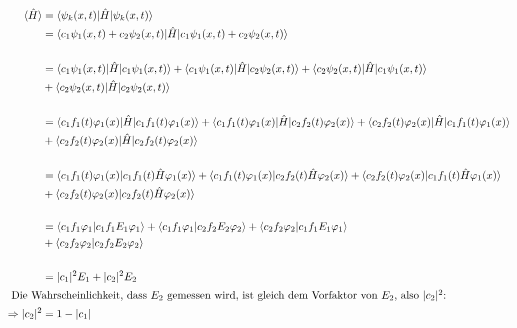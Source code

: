     \begin{align*}
        \langle \hat{H} \rangle &= \langle \psi_k(x, t) \vert \hat{H} \vert \psi_k(x, t) \rangle\\
        &= \langle c_1 \psi_1(x, t) + c_2 \psi_2(x, t) \vert \hat{H} \vert c_1 \psi_1(x, t) + c_2 \psi_2(x, t) \rangle\\
        \\
        &= \langle c_1 \psi_1(x, t) \vert \hat{H} \vert c_1 \psi_1(x, t) \rangle 
        + \langle c_1 \psi_1(x, t) \vert \hat{H} \vert c_2 \psi_2(x, t) \rangle
        + \langle c_2 \psi_2(x, t) \vert \hat{H} \vert c_1 \psi_1(x, t) \rangle\\
        &+ \langle c_2 \psi_2(x, t) \vert \hat{H} \vert c_2 \psi_2(x, t) \rangle\\
        \\
        &= \langle c_1 f_1(t) \varphi_1(x) \vert \hat{H} \vert c_1 f_1(t) \varphi_1(x) \rangle 
        + \langle c_1 f_1(t) \varphi_1(x) \vert \hat{H} \vert c_2 f_2(t) \varphi_2(x) \rangle
        + \langle c_2 f_2(t) \varphi_2(x) \vert \hat{H} \vert c_1 f_1(t) \varphi_1(x) \rangle\\
        &+ \langle c_2 f_2(t) \varphi_2(x) \vert \hat{H} \vert c_2 f_2(t) \varphi_2(x) \rangle\\
        \\
        &= \langle c_1 f_1(t) \varphi_1(x) \vert c_1 f_1(t) \hat{H} \varphi_1(x) \rangle
        + \langle c_1 f_1(t) \varphi_1(x) \vert c_2 f_2(t) \hat{H} \varphi_2(x) \rangle
        + \langle c_2 f_2(t) \varphi_2(x) \vert c_1 f_1(t) \hat{H} \varphi_1(x) \rangle\\
        &+ \langle c_2 f_2(t) \varphi_2(x) \vert c_2 f_2(t) \hat{H} \varphi_2(x) \rangle\\
        \\
        &= \langle c_1 f_1 \varphi_1 \vert c_1 f_1 E_1 \varphi_1 \rangle
        + \langle c_1 f_1 \varphi_1 \vert c_2 f_2 E_2 \varphi_2 \rangle
        + \langle c_2 f_2 \varphi_2 \vert c_1 f_1 E_1 \varphi_1 \rangle\\
        &+ \langle c_2 f_2 \varphi_2 \vert c_2 f_2 E_2 \varphi_2 \rangle\\
        \\
        &= \lvert c_1\rvert^2 E_1 + \lvert c_2\rvert^2 E_2\\
        \intertext{
            Die Wahrscheinlichkeit, dass $E_2$ gemessen wird, ist gleich dem Vorfaktor von $E_2$, also $\lvert c_2\rvert^2 $:
        }
        \Rightarrow \lvert c_2\rvert^2 &= 1 - \lvert c_1\rvert
    \end{align*}


